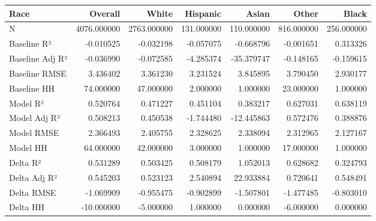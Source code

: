 \begin{tabular}{lrrrrrr}
\toprule
Race &      Overall &        White &    Hispanic &       Asian &       Other &       Black \\
\midrule
N               &  4076.000000 &  2763.000000 &  131.000000 &  110.000000 &  816.000000 &  256.000000 \\
Baseline R²     &    -0.010525 &    -0.032198 &   -0.057075 &   -0.668796 &   -0.001651 &    0.313326 \\
Baseline Adj R² &    -0.036990 &    -0.072585 &   -4.285374 &  -35.379747 &   -0.148165 &   -0.159615 \\
Baseline RMSE   &     3.436402 &     3.361230 &    3.231524 &    3.845895 &    3.790450 &    2.930177 \\
Baseline HH     &    74.000000 &    47.000000 &    2.000000 &    1.000000 &   23.000000 &    1.000000 \\
Model R²        &     0.520764 &     0.471227 &    0.451104 &    0.383217 &    0.627031 &    0.638119 \\
Model Adj R²    &     0.508213 &     0.450538 &   -1.744480 &  -12.445863 &    0.572476 &    0.388876 \\
Model RMSE      &     2.366493 &     2.405755 &    2.328625 &    2.338094 &    2.312965 &    2.127167 \\
Model HH        &    64.000000 &    42.000000 &    3.000000 &    1.000000 &   17.000000 &    1.000000 \\
Delta R²        &     0.531289 &     0.503425 &    0.508179 &    1.052013 &    0.628682 &    0.324793 \\
Delta Adj R²    &     0.545203 &     0.523123 &    2.540894 &   22.933884 &    0.720641 &    0.548491 \\
Delta RMSE      &    -1.069909 &    -0.955475 &   -0.902899 &   -1.507801 &   -1.477485 &   -0.803010 \\
Delta HH        &   -10.000000 &    -5.000000 &    1.000000 &    0.000000 &   -6.000000 &    0.000000 \\
\bottomrule
\end{tabular}
